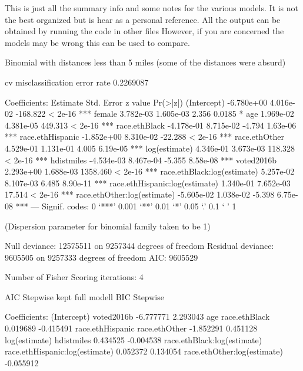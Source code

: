 
This is just all the summary info and some notes for the various models.
It is not the best organized but is hear as a personal reference.
All the output can be obtained by running the code in other files
However, if you are concerned the models may be wrong this can be used to compare.




Binomial with distances less than 5 miles (some of the distances were absurd)

cv misclassification error rate 0.2269087

Coefficients:
                                 Estimate Std. Error  z value Pr(>|z|)
(Intercept)                    -6.780e+00  4.016e-02 -168.822  < 2e-16 ***
female                          3.782e-03  1.605e-03    2.356   0.0185 *
age                             1.969e-02  4.381e-05  449.313  < 2e-16 ***
race.ethBlack                  -4.178e-01  8.715e-02   -4.794 1.63e-06 ***
race.ethHispanic               -1.852e+00  8.310e-02  -22.288  < 2e-16 ***
race.ethOther                   4.529e-01  1.131e-01    4.005 6.19e-05 ***
log(estimate)                   4.346e-01  3.673e-03  118.328  < 2e-16 ***
hdistmiles                     -4.534e-03  8.467e-04   -5.355 8.58e-08 ***
voted2016b                      2.293e+00  1.688e-03 1358.460  < 2e-16 ***
race.ethBlack:log(estimate)     5.257e-02  8.107e-03    6.485 8.90e-11 ***
race.ethHispanic:log(estimate)  1.340e-01  7.652e-03   17.514  < 2e-16 ***
race.ethOther:log(estimate)    -5.605e-02  1.038e-02   -5.398 6.75e-08 ***
---
Signif. codes:  0 ‘***’ 0.001 ‘**’ 0.01 ‘*’ 0.05 ‘.’ 0.1 ‘ ’ 1

(Dispersion parameter for binomial family taken to be 1)

    Null deviance: 12575511  on 9257344  degrees of freedom
Residual deviance:  9605505  on 9257333  degrees of freedom
AIC: 9605529

Number of Fisher Scoring iterations: 4

AIC Stepwise kept full modell
BIC Stepwise

Coefficients:
                   (Intercept)                      voted2016b
                     -6.777771                        2.293043
                           age                   race.ethBlack
                      0.019689                       -0.415491
              race.ethHispanic                   race.ethOther
                     -1.852291                        0.451128
                 log(estimate)                      hdistmiles
                      0.434525                       -0.004538
   race.ethBlack:log(estimate)  race.ethHispanic:log(estimate)
                      0.052372                        0.134054
   race.ethOther:log(estimate)
                     -0.055912


